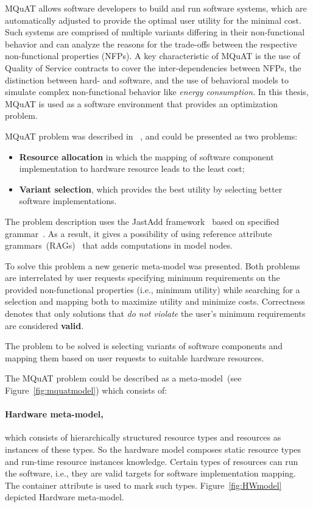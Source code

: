 MQuAT allows software developers to build and run software systems, which are automatically adjusted to provide the optimal user utility for the minimal cost. Such systems are comprised of multiple variants differing in their non-functional behavior and can analyze the reasons for the trade-offs between the respective non-functional properties (NFPs).  A key characteristic of MQuAT is the use of Quality of Service contracts to cover the inter-dependencies between NFPs,  the distinction between hard- and software, and the use of behavioral models to simulate complex non-functional behavior like \textit{energy consumption}.
In this thesis, MQuAT is used as a software environment that provides an optimization problem.

MQuAT problem was described in ~\cite{gotz18}, and could be presented as two problems:

\begin{itemize}
	\item \textbf{Resource allocation} in which the mapping of software component implementation to hardware resource leads to the least cost;
	\item \textbf{Variant selection}, which provides the best utility by selecting better software implementations.
\end{itemize} 

The problem description uses the JastAdd framework~\cite{ekman07} based on specified grammar~\cite{gotz2018JastAdd}. As a result, it gives a possibility of using reference attribute grammars~(RAGs)~\cite{hedin2000} that adds computations in model nodes.

To solve this problem a new generic meta-model was presented. Both problems are interrelated by user requests specifying minimum requirements on the provided non-functional properties (i.e., minimum utility) while searching for a selection and mapping both to maximize utility and minimize costs. Correctness denotes that only solutions that \textit{do not violate} the user's minimum requirements are considered \textbf{valid}.

The problem to be solved is selecting variants of software components and mapping them based on user requests to suitable hardware resources.


The MQuAT problem could be described as a meta-model~(see Figure~\ref{fig:mquatmodel}) which consists of:
\paragraph{Hardware meta-model,}which consists of hierarchically structured resource types and resources as instances of these types. So the hardware model composes static resource types and run-time resource instances knowledge. Certain types of resources can run the software, i.e., they are valid targets for software implementation mapping. The container attribute is used to mark such types. Figure~\ref{fig:HWmodel} depicted Hardware meta-model.

